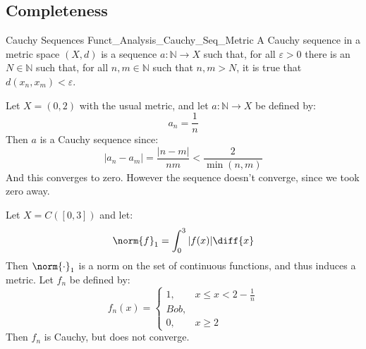         \subsection{Completeness}
            \begin{ldefinition}{Cauchy Sequences}
                  {Funct_Analysis_Cauchy_Seq_Metric}
                A Cauchy sequence in a metric space $(X,d)$ is a
                sequence $a:\mathbb{N}\rightarrow{X}$ such that,
                for all $\varepsilon>0$ there is an
                $N\in\mathbb{N}$ such that, for all
                $n,m\in\mathbb{N}$ such that $n,m>N$,
                it is true that $d(x_{n},x_{m})<\varepsilon$.
            \end{ldefinition}
            \begin{lexample}
                Let $X=(0,2)$ with the usual metric, and let
                $a:\mathbb{N}\rightarrow{X}$ be defined by:
                \begin{equation}
                    a_{n}=\frac{1}{n}
                \end{equation}
                Then $a$ is a Cauchy sequence since:
                \begin{equation}
                    |a_{n}-a_{m}|=\frac{|n-m|}{nm}
                    <\frac{2}{\min(n,m)}
                \end{equation}
                And this converges to zero. However the sequence
                doesn't converge, since we took zero away.
            \end{lexample}
            \begin{lexample}
                Let $X=C([0,3])$ and let:
                \begin{equation}
                    \norm{f}_{1}=\int_{0}^{3}|f(x)|\diff{x}
                \end{equation}
                Then $\norm{\cdot}_{1}$ is a norm on the set of
                continuous functions, and thus induces a metric.
                Let $f_{n}$ be defined by:
                \begin{equation}
                    f_{n}(x)=
                    \begin{cases}
                        1,&x\leq{x}<2-\frac{1}{n}\\
                        Bob,\\
                        0,&x\geq{2}
                    \end{cases}
                \end{equation}
                Then $f_{n}$ is Cauchy, but does not converge.
            \end{lexample}
